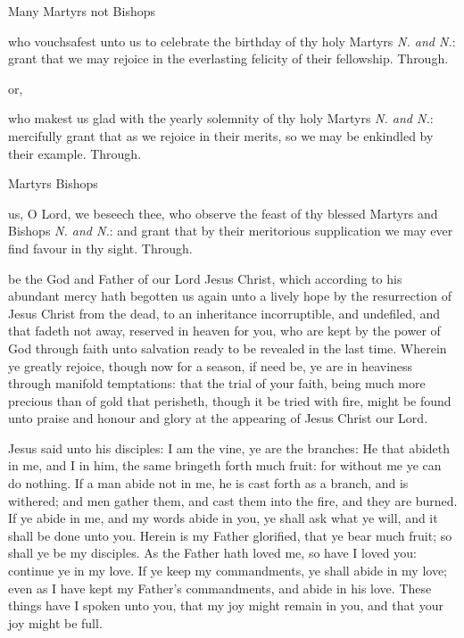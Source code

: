 \collect
\begin{inhead}
	Many Martyrs not Bishops
\end{inhead}
 who vouchsafest unto us to celebrate the birthday of thy holy Martyrs \textit{N. and N.}: grant that we may rejoice in the everlasting felicity of their fellowship. Through.
\begin{inhead}
	or,
\end{inhead}
 who makest us glad with the yearly solemnity of thy holy Martyrs \textit{N. and N.}: mercifully grant that as we rejoice in their merits, so we may be enkindled by their example. Through.

\begin{inhead}
	Martyrs Bishops
\end{inhead}
 us, O Lord, we beseech thee, who observe the feast of thy blessed Martyrs and Bishops \textit{N. and N.}: and grant that by their meritorious supplication we may ever find favour in thy sight. Through.

 be the God and Father of our Lord Jesus Christ, which according to his abundant mercy hath begotten us again unto a lively hope by the resurrection of Jesus Christ from the dead, to an inheritance incorruptible, and undefiled, and that fadeth not away, reserved in heaven for you, who are kept by the power of God through faith unto salvation ready to be revealed in the last time. Wherein ye greatly rejoice, though now for a season, if need be, ye are in heaviness through manifold temptations: that the trial of your faith, being much more precious than of gold that perisheth, though it be tried with fire, might be found unto praise and honour and glory at the appearing of Jesus Christ our Lord.


 Jesus said unto his disciples: I am the vine, ye are the branches: He that abideth in me, and I in him, the same bringeth forth much fruit: for without me ye can do nothing. If a man abide not in me, he is cast forth as a branch, and is withered; and men gather them, and cast them into the fire, and they are burned. If ye abide in me, and my words abide in you, ye shall ask what ye will, and it shall be done unto you. Herein is my Father glorified, that ye bear much fruit; so shall ye be my disciples. As the Father hath loved me, so have I loved you: continue ye in my love. If ye keep my commandments, ye shall abide in my love; even as I have kept my Father’s commandments, and abide in his love. These things have I spoken unto you, that my joy might remain in you, and that your joy might be full.

